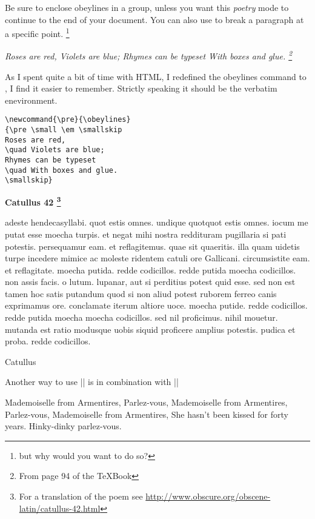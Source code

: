 {Be sure to enclose
obeylines in a group, unless you want this \textit{poetry} mode to continue to the end of
your document.  You can also use  to break a paragraph at a specific point.  \footnote{but why would you want to do so?}

\newcommand{\pre}{\obeylines}
{\pre \small \em \smallskip
Roses are red,
\quad Violets are blue;
Rhymes can be typeset
\quad With boxes and glue. \footnote{From page 94 of the TeXBook}
\smallskip}

As I spent quite a bit of time with HTML, I redefined the obeylines command to , I find it easier to remember. Strictly speaking it should be the verbatim enevironment.

{\small
\begin{verbatim}
\newcommand{\pre}{\obeylines}
{\pre \small \em \smallskip
Roses are red,
\quad Violets are blue;
Rhymes can be typeset
\quad With boxes and glue.
\smallskip}
\end{verbatim}
}



{\obeylines
{\Large\bf  Catullus 42 \footnote{For a translation of the poem see \url{http://www.obscure.org/obscene-latin/catullus-42.html}}}

adeste hendecasyllabi. quot estis 
omnes. undique quotquot estis omnes. 
iocum me putat esse moecha turpis. 
et negat mihi nostra reddituram 
pugillaria si pati potestis. 
persequamur eam. et reflagitemus. 
quae sit quaeritis. illa quam uidetis 
turpe incedere mimice ac moleste 
ridentem catuli ore Gallicani. 
circumsistite eam. et reflagitate. 
moecha putida. redde codicillos. 
redde putida moecha codicillos. 
non assis facis. o lutum. lupanar, 
aut si perditius potest quid esse. 
sed non est tamen hoc satis putandum 
quod si non aliud potest ruborem 
ferreo canis exprimamus ore. 
conclamate iterum altiore uoce. 
moecha putide. redde codicillos. 
redde putida moecha moecha codicillos. 
sed nil proficimus. nihil mouetur. 
mutanda est ratio modusque uobis 
siquid proficere amplius potestis. 
pudica et proba. redde codicillos.


\hfil Catullus\par}


\bigskip
Another way to use |\obeylines| is in combination with |\everypar|

{\obeylines\everypar{\hfill}\parindent=0pt
Mademoiselle from Armentires, Parlez-vous,
Mademoiselle from Armentires, Parlez-vous,
Mademoiselle from Armentires,
She hasn't been kissed for forty years.
Hinky-dinky parlez-vous.

}}
